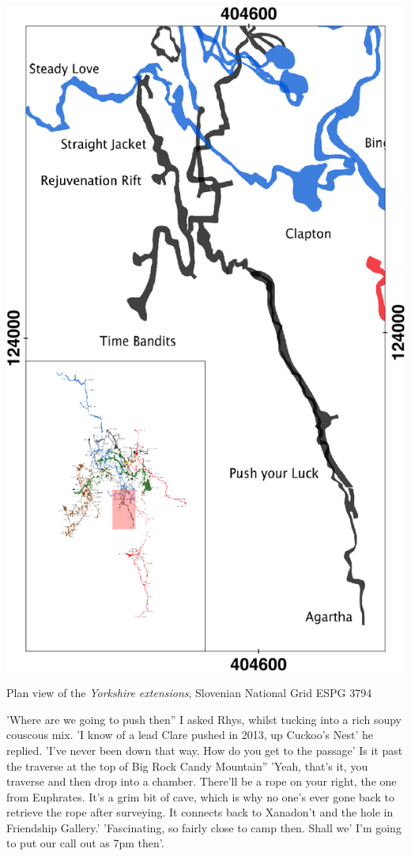  \begin{marginfigure}
\checkoddpage \ifoddpage \forcerectofloat \else \forceversofloat \fi
\centering
 \includegraphics[width=\linewidth]{images/2015/tanguy-push-2015/push_your_luck_inset}
 \caption{Plan view of the \emph{Yorkshire extensions}, Slovenian National Grid ESPG 3794}
 \label{Labyrinth inset}
\end{marginfigure}

'Where are we going to push then'' I asked Rhys, whilst tucking into a rich soupy couscous mix. 
'I know of a lead Clare pushed in 2013, up Cuckoo's Nest' he replied. 
'I've never been down that way. How do you get to the passage' Is it past the traverse at the top of Big Rock Candy Mountain''
'Yeah, that's it, you traverse and then drop into a chamber. There'll be a rope on your right, the one from Euphrates. It's a grim bit of cave, which is why no one's ever gone back to retrieve the rope after surveying. It connects back to Xanadon't and the hole in Friendship Gallery.'
'Fascinating, so fairly close to camp then. Shall we' I'm going to put our call out as 7pm then'. 

